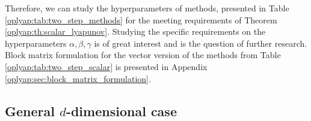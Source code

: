 \documentclass[a4paper,11pt]{article}
\begin{document}
Therefore, we can study the hyperparameters of methods, presented in Table \ref{oplyap:tab:two_step_methods} for the meeting requirements of Theorem \eqref{oplyap:th:scalar_lyapunov}. Studying the specific requirements on the hyperparameters $\alpha, \beta, \gamma$ is of great interest and is the question of further research. 
Block matrix formulation for the vector version of the methods from Table \ref{oplyap:tab:two_step_scalar} is presented in Appendix \ref{oplyap:sec:block_matrix_formulation}.

\subsection{General $d$-dimensional case}
\end{document}
